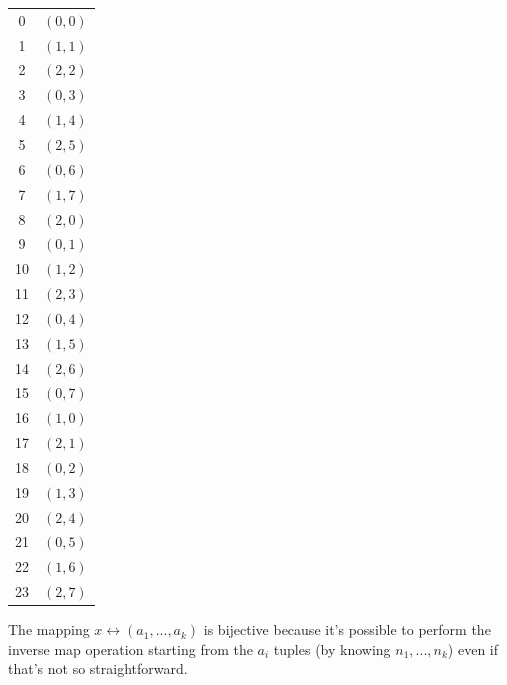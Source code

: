 \documentclass[11pt, a4paper]{article}
\begin{document}
\begin{center}
    \begin{tabular}{|c|c|}
        \hline
        0&$(0,0)$\\
        1&$(1,1)$\\
        2&$(2,2)$\\
        3&$(0,3)$\\
        4&$(1,4)$\\
        5&$(2,5)$\\
        6&$(0,6)$\\
        7&$(1,7)$\\
        8&$(2,0)$\\
        9&$(0,1)$\\
        10&$(1,2)$\\
        11&$(2,3)$\\
        12&$(0,4)$\\
        13&$(1,5)$\\
        14&$(2,6)$\\
        15&$(0,7)$\\
        16&$(1,0)$\\
        17&$(2,1)$\\
        18&$(0,2)$\\
        19&$(1,3)$\\
        20&$(2,4)$\\
        21&$(0,5)$\\
        22&$(1,6)$\\
        23&$(2,7)$\\
        \hline
    \end{tabular}
\end{center}
The mapping $x\leftrightarrow(a_1,...,a_k)$ is bijective because it's possible to perform the inverse map operation starting from the $a_i$ tuples (by knowing $n_1,...,n_k$) even if that's not so straightforward.
\end{document}
